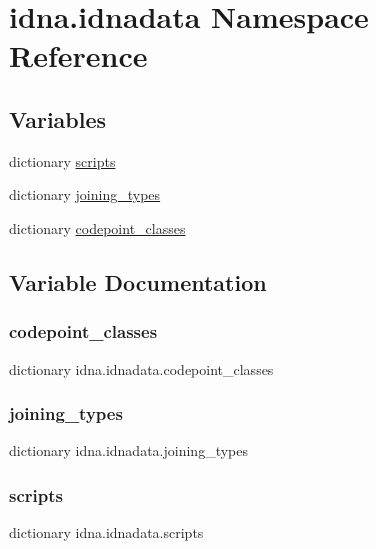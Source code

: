 \hypertarget{namespaceidna_1_1idnadata}{}\section{idna.\+idnadata Namespace Reference}
\label{namespaceidna_1_1idnadata}
\subsection*{Variables}
\begin{DoxyCompactItemize}
\item 
dictionary \hyperlink{namespaceidna_1_1idnadata_ab7a152627435bbe38d955cc8a7188a98}{scripts}
\item 
dictionary \hyperlink{namespaceidna_1_1idnadata_a3d3e7f40761c2b8bce7065b2199df98a}{joining\+\_\+types}
\item 
dictionary \hyperlink{namespaceidna_1_1idnadata_aa566cc69163daa48b015f7a35a4c30eb}{codepoint\+\_\+classes}
\end{DoxyCompactItemize}


\subsection{Variable Documentation}
\mbox{\label{namespaceidna_1_1idnadata_aa566cc69163daa48b015f7a35a4c30eb}} 
\subsubsection{\texorpdfstring{codepoint\+\_\+classes}{codepoint\_classes}}
{\footnotesize\ttfamily dictionary idna.\+idnadata.\+codepoint\+\_\+classes}

\mbox{\label{namespaceidna_1_1idnadata_a3d3e7f40761c2b8bce7065b2199df98a}} 
\subsubsection{\texorpdfstring{joining\+\_\+types}{joining\_types}}
{\footnotesize\ttfamily dictionary idna.\+idnadata.\+joining\+\_\+types}

\mbox{\label{namespaceidna_1_1idnadata_ab7a152627435bbe38d955cc8a7188a98}} 
\subsubsection{\texorpdfstring{scripts}{scripts}}
{\footnotesize\ttfamily dictionary idna.\+idnadata.\+scripts}

